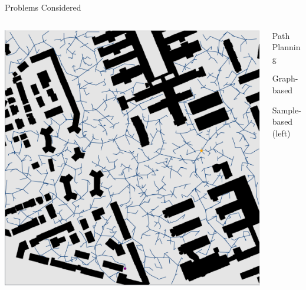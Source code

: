 \documentclass[aspectratio=169]{beamer}
\makeatletter
\renewcommand{\emph}[1]{{\Huge \color{pureminimalistic@text@red} #1}}
\renewcommand{\white}[1]{{\color{pureminimalistic@text@white} #1}}
\makeatother
\begin{document}
\begin{frame}[plain]{\white{Problems Considered}}
  \begin{columns}[T]
      \begin{column}{.5\linewidth}
          \includegraphics[width=1.0\linewidth, keepaspectratio]{figures/one_off.pdf}
      \end{column}
      \begin{column}{.5\linewidth}
          \emph{Path Planning}
          \begin{vfilleditems}
              \item {\Large Graph-based}
              \vspace{1em}
              \item {\Large Sample-based \Medium (left)}

\end{vfilleditems}
\end{column}
\end{columns}
\end{frame}
\end{document}
